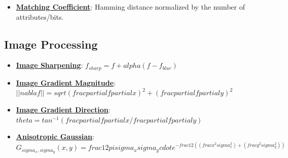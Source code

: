 \documentclass{article}%
\begin{document}
\begin{itemize}[leftmargin=*]
\item \href{https://purdue.brightspace.com/d2l/common/assets/pdfjs-d2l-dist/1.0.14-legacy/web/viewer.html?file=\%2Fcontent\%2Fenforced\%2F1095467-wl.202510.CS.24300.001\%2F12L2-distance-clusters.pdf\%3Fou\%3D1095467\&lang=en-us\&container=d2l-fileviewer-rendered-pdf\&fullscreen=d2l-fileviewer-rendered-pdf-dialog\&height=667#page=19}{\textbf{Matching Coefficient}}: Hamming distance normalized by the number of attributes/bits.%
\end{itemize}

%
\subsection{Image Processing}%
\label{subsec:ImageProcessing}%
\begin{itemize}[leftmargin=*]%
\item \href{https://purdue.brightspace.com/d2l/common/assets/pdfjs-d2l-dist/1.0.14-legacy/web/viewer.html?file=\%2Fcontent\%2Fenforced\%2F1095467-wl.202510.CS.24300.001\%2F07L2-Vision.pdf\%3Fou\%3D1095467\&lang=en-us\&container=d2l-fileviewer-rendered-pdf\&fullscreen=d2l-fileviewer-rendered-pdf-dialog\&height=667#page=55}{\textbf{Image Sharpening}}: $f_{sharp} = f + alpha(f - f_{blur})$%
\item \href{https://purdue.brightspace.com/d2l/common/assets/pdfjs-d2l-dist/1.0.14-legacy/web/viewer.html?file=\%2Fcontent\%2Fenforced\%2F1095467-wl.202510.CS.24300.001\%2F08L2-Feature Extraction.pdf\%3Fou\%3D1095467\&lang=en-us\&container=d2l-fileviewer-rendered-pdf\&fullscreen=d2l-fileviewer-rendered-pdf-dialog\&height=667#page=17}{\textbf{Image Gradient Magnitude}}: $||nabla f|| = sqrt{(frac{partial f}{partial x})^2 + (frac{partial f}{partial y})^2}$%
\item \href{https://purdue.brightspace.com/d2l/common/assets/pdfjs-d2l-dist/1.0.14-legacy/web/viewer.html?file=\%2Fcontent\%2Fenforced\%2F1095467-wl.202510.CS.24300.001\%2F08L2-Feature Extraction.pdf\%3Fou\%3D1095467\&lang=en-us\&container=d2l-fileviewer-rendered-pdf\&fullscreen=d2l-fileviewer-rendered-pdf-dialog\&height=667#page=34}{\textbf{Image Gradient Direction}}: $theta = tan^{-1}(frac{partial f}{partial x} / frac{partial f}{partial y})$%
\item \href{https://purdue.brightspace.com/d2l/common/assets/pdfjs-d2l-dist/1.0.14-legacy/web/viewer.html?file=\%2Fcontent\%2Fenforced\%2F1095467-wl.202510.CS.24300.001\%2F08L2-Feature Extraction.pdf\%3Fou\%3D1095467\&lang=en-us\&container=d2l-fileviewer-rendered-pdf\&fullscreen=d2l-fileviewer-rendered-pdf-dialog\&height=667#page=43}{\textbf{Anisotropic Gaussian}}: $G_{sigma_x, sigma_y}(x, y) = frac{1}{2pisigma_xsigma_y} cdot e^{-frac{1}{2}((frac{x^2}{sigma_x^2}) + (frac{y^2}{sigma_y^2}))}$%

\end{itemize}
\end{document}
